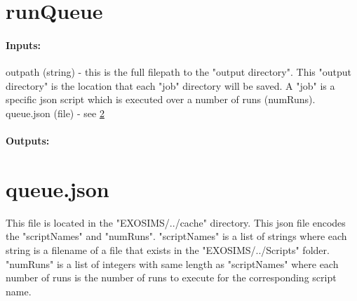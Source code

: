 \documentclass[12pt]{article}
\begin{document}


\section{runQueue}
\paragraph{Inputs:}
outpath (string) - this is the full filepath to the "output directory". This "output directory" is the location that each "job" directory will be saved. A "job" is a specific json script which is executed over a number of runs (numRuns).
queue.json (file) - see \ref{sec:queue.json}
\paragraph{Outputs:}


\section{queue.json}\label{sec:queue.json}
This file is located in the "EXOSIMS/../cache" directory.
This json file encodes the "scriptNames" and "numRuns".
"scriptNames" is a list of strings where each string is a filename of a file that exists in the "EXOSIMS/../Scripts" folder.
"numRuns" is a list of integers with same length as "scriptNames" where each number of runs is the number of runs to execute for the corresponding script name.

\nocite{*}

%
%
%
\end{document}

